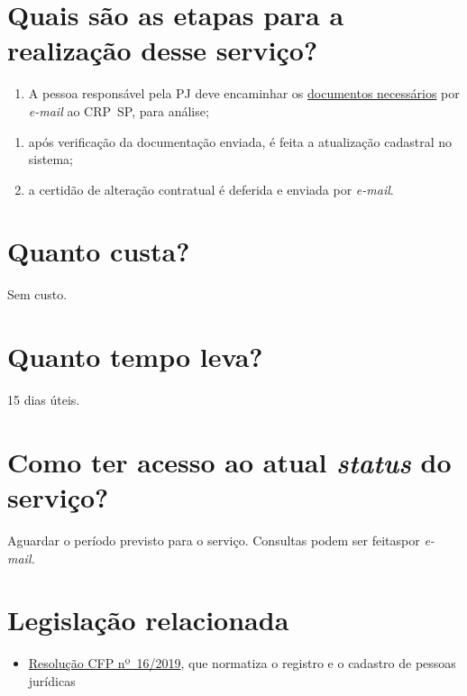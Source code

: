 \section{Quais são as etapas para a realização desse serviço?}

\begin{enumerate}
  \item  A pessoa responsável pela PJ deve encaminhar os  \href{https://www.crpsp.org/pagina/view/320}{documentos necessários}  por \emph{e-mail} ao CRP~SP, para análise;
\end{enumerate}

\begin{enumerate}
  \item  após verificação da documentação enviada, é feita a atualização  cadastral no sistema;
  \item  a certidão de alteração contratual é deferida e enviada por  \emph{e-mail}.
\end{enumerate}

\section{Quanto custa?}

Sem custo.

\section{Quanto tempo leva?}

15 dias úteis.

\section{Como ter acesso ao atual \emph{status} do serviço?}

Aguardar o período previsto para o serviço. Consultas podem ser feitaspor \emph{e-mail.}

\section{Legislação relacionada}

\begin{itemize}
  \item  \href{https://atosoficiais.com.br/cfp/resolucao-administrativa-financeira-n-16-2019-altera-o-manual-de-procedimentos-administrativo-e-financeiro-do-sistema-conselhos-de-psicologia-anexo-da-resolucao-cfp-n-202018-a-resolucao-cfp-n-03-2007-a-resolucao-cfp-n-16-2019-e-da-outras-providencias}{Resolução  CFP nº~16/2019}, que normatiza o registro e o cadastro de pessoas  jurídicas
\end{itemize}


